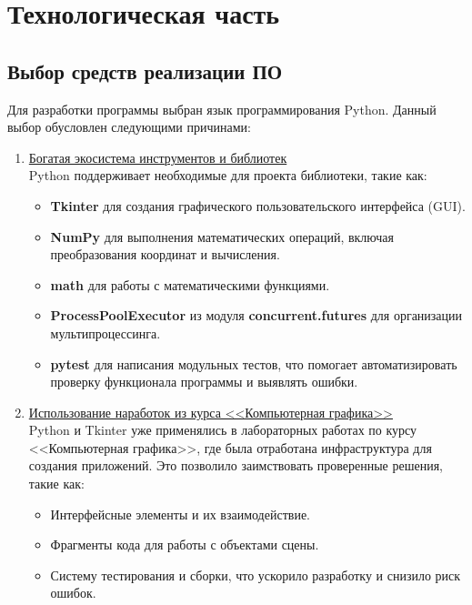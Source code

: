 \section{Технологическая часть}
\subsection{Выбор средств реализации ПО}

\hspace{1.25cm}
Для разработки программы выбран язык программирования Python. Данный выбор обусловлен следующими причинами:

\begin{enumerate}
    \item \underline{Богатая экосистема инструментов и библиотек}\\ 
    Python поддерживает необходимые для проекта библиотеки, такие как:
    \begin{itemize}
        \item \textbf{Tkinter} для создания графического пользовательского интерфейса (GUI).
        \item \textbf{NumPy} для выполнения математических операций, включая преобразования координат и вычисления.
        \item \textbf{math} для работы с математическими функциями.
        \item \textbf{ProcessPoolExecutor} из модуля \textbf{concurrent.futures} для организации мультипроцессинга.
        \item \textbf{pytest} для написания модульных тестов, что помогает автоматизировать проверку функционала программы и выявлять ошибки.
    \end{itemize}

    \item \underline{Использование наработок из курса <<Компьютерная графика>>}\\ 
    Python и Tkinter уже применялись в лабораторных работах по курсу <<Компьютерная графика>>, где была отработана инфраструктура для создания приложений. Это позволило заимствовать проверенные решения, такие как:
    \begin{itemize}
        \item Интерфейсные элементы и их взаимодействие.
        \item Фрагменты кода для работы с объектами сцены.
        \item Систему тестирования и сборки, что ускорило разработку и снизило риск ошибок.
    \end{itemize}
    

\end{enumerate}
